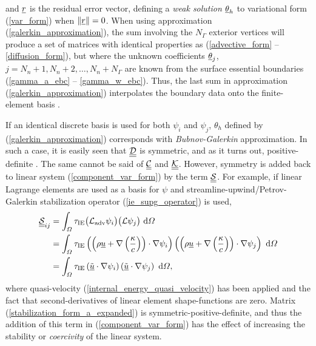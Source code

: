 and $\underline{r}$ is the residual error vector, defining a \emph{weak solution} $\underline{\theta}_h$ to variational form (\ref{var_form}) when $\Vert \underline{r} \Vert = 0$.  When using approximation (\ref{galerkin_approximation}), the sum involving the $N_{\Gamma}$ exterior vertices will produce a set of matrices with identical properties as (\ref{advective_form} -- \ref{diffusion_form}), but where the unknown coefficients $\underline{\theta}_j$, $j = N_n+1,N_n+2,\ldots,N_n+N_{\Gamma}$ are  known from the surface essential boundaries (\ref{gamma_a_ebc} -- \ref{gamma_w_ebc}).  Thus, the last sum in approximation (\ref{galerkin_approximation}) interpolates the boundary data onto the finite-element basis \citep{elman_2005}.

If an identical discrete basis is used for both $\psi_i$ and $\psi_j$, $\theta_h$ defined by (\ref{galerkin_approximation}) corresponds with \emph{Bubnov-Galerkin} approximation.  In such a case, it is easily seen that $\underline{\underline{\mathcal{D}}}$ is symmetric, and as it turns out, positive-definite \citep{elman_2005}.  The same cannot be said of $\underline{\underline{\mathcal{C}}}$ and $\underline{\underline{\mathcal{K}}}$.  However, symmetry is added back to linear system (\ref{component_var_form}) by the term $\underline{\underline{\mathcal{S}}}$.  For example, if linear Lagrange elements are used as a basis for $\psi$ and streamline-upwind/Petrov-Galerkin stabilization operator (\ref{ie_supg_operator}) is used,
{\small
\begin{align}
  \label{stabilization_form_a_expanded}
  \underline{\underline{\mathcal{S}}}_{ij} &= \int_{\varOmega} \tau_{\text{IE}} \big( \mathcal{L}_{\text{adv}} \psi_i \big) \big( \mathcal{L} \psi_j \big) \ \mathrm{d}\varOmega \notag \\
  &= \int_{\varOmega} \tau_{\text{IE}} \left( \left( \rho \underline{u} + \nabla \left( \frac{\kappa}{c} \right) \right) \cdot \nabla \psi_i \right) \left( \left( \rho \underline{u} + \nabla \left( \frac{\kappa}{c} \right) \right) \cdot \nabla \psi_j \right) \ \mathrm{d}\varOmega \notag \\
  &= \int_{\varOmega} \tau_{\text{IE}} \left( \tilde{\underline{u}} \cdot \nabla \psi_i \right) \left( \tilde{\underline{u}} \cdot \nabla \psi_j \right) \ \mathrm{d}\varOmega,
\end{align}}
where quasi-velocity (\ref{internal_energy_quasi_velocity}) has been applied and the fact that second-derivatives of linear element shape-functions are zero.  Matrix (\ref{stabilization_form_a_expanded}) is symmetric-positive-definite, and thus the addition of this term in (\ref{component_var_form}) has the effect of increasing the stability or \emph{coercivity} of the linear system.

